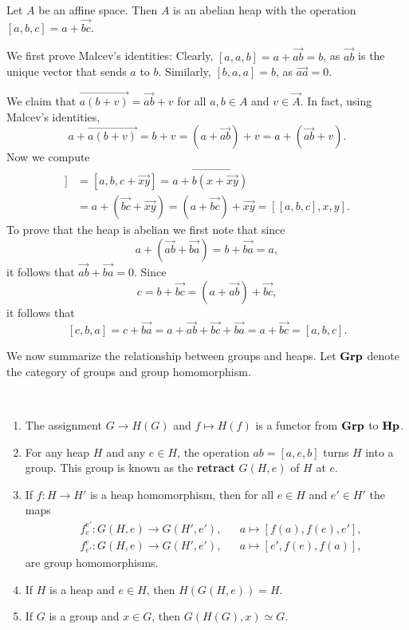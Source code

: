 \documentclass[graybox]{svmult}
\newcommand{\category}[1]{{\normalfont\textbf{#1}}}
\newcommand{\Grp}{\category{Grp}}
\newcommand{\Hp}{\category{Hp}}
\begin{document}
\begin{example}
    Let $A$ be an affine space. Then $A$ is an abelian 
    heap with the operation $[a,b,c]=a+\overrightarrow{bc}$. 
    
    We first prove Malcev's identities:
    Clearly, $[a,a,b]=a+\overrightarrow{ab}=b$, as $\overrightarrow{ab}$ is the unique
    vector that sends $a$ to $b$. Similarly, $[b,a,a]=b$, as $\overrightarrow{aa}=0$. 
    
    We claim that
    $\overrightarrow{a(b+v)}=\overrightarrow{ab}+v$ for all $a,b\in A$ and $v\in\overrightarrow{A}$. 
    In fact, using Malcev's identities, 
    \[
    a+\overrightarrow{a(b+v)}=b+v=\left(a+\overrightarrow{ab}\right)+v=a+\left(\overrightarrow{ab}+v\right).
    \]
    Now we compute
    \begin{align*}
        [a,b,[c,x,y]] &= \left[a,b,c+\overrightarrow{xy}\right]
        =a+\overrightarrow{b\left(x+\overrightarrow{xy}\right)}\\
        &=a+\left(\overrightarrow{bc}+\overrightarrow{xy}\right)
        =\left(a+\overrightarrow{bc}\right)+\overrightarrow{xy}
        =[[a,b,c],x,y].
    \end{align*}
    To prove that the heap is abelian we first note that since 
    \[
    a+\left(\overrightarrow{ab}+\overrightarrow{ba}\right)=b+\overrightarrow{ba}=a,
    \]
    it follows that $\overrightarrow{ab}+\overrightarrow{ba}=0$. Since
    \[
    c=b+\overrightarrow{bc}=\left(a+\overrightarrow{ab}\right)+\overrightarrow{bc},
    \]
    it follows that 
    \[
    [c,b,a]=c+\overrightarrow{ba}=a+\overrightarrow{ab}+\overrightarrow{bc}+\overrightarrow{ba}
    =a+\overrightarrow{bc}
    =[a,b,c].
    \]
\end{example}

We now summarize the relationship between groups and heaps. Let $\Grp$ denote 
the category of groups and group homomorphism. 

\begin{theorem}\
\label{thm:heaps_and_groups}
\begin{enumerate}
    \item The assignment $G\to H(G)$ and $f\mapsto H(f)$ is a functor from $\Grp$ to $\Hp$.
    \item For any heap $H$ and any $e\in H$, the operation $ab=[a,e,b]$ turns $H$ into a group. 
    This group is known as the \textbf{retract} 
    $G(H,e)$ of $H$ at $e$. 
    \item If $f\colon H\to H'$ is a heap homomorphism, then for all $e\in H$ and $e'\in H'$
    the maps
    \begin{align*}
        &f_e^{e'}\colon G(H,e)\to G(H',e'),&&a\mapsto [f(a),f(e),e'],\\
        &f_{e'}^{e}\colon G(H,e)\to G(H',e'),&&a\mapsto [e',f(e),f(a)],
    \end{align*}
    are group homomorphisms. 
    \item If $H$ is a heap and $e\in H$, then $H(G(H,e))=H$.
    \item If $G$ is a group and $x\in G$, then $G(H(G),x)\simeq G$. 
\end{enumerate}
\end{theorem}
\end{document}
